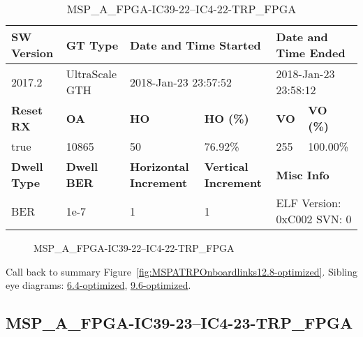 \begin{table}[h]
\centering
\caption{MSP\_A\_FPGA-IC39-22--IC4-22-TRP\_FPGA}
\label{tab:MSPAFPGAIC3922IC422TRPFPGA12.8-optimized}
\begin{tabular}{@{}|l|l|l|l|l|l|@{}}
\toprule
\textbf{SW Version}                & \textbf{GT Type}   & \multicolumn{2}{l|}{\textbf{Date and Time Started}}            & \multicolumn{2}{l|}{\textbf{Date and Time Ended}}        \\ \midrule
2017.2                       & UltraScale GTH          & \multicolumn{2}{l|}{2018-Jan-23 23:57:52}                   & \multicolumn{2}{l|}{2018-Jan-23 23:58:12}               \\ \midrule
\textbf{Reset RX}                  & \textbf{OA} & \textbf{HO}   & \textbf{HO (\%)} & \textbf{VO} & \textbf{VO (\%)} \\ \midrule
true & 10865        & 50          & 76.92\%        & 255        & 100.00\%       \\ \midrule
\textbf{Dwell Type}                & \textbf{Dwell BER} & \textbf{Horizontal Increment} & \textbf{Vertical Increment}    & \multicolumn{2}{l|}{\textbf{Misc Info}}                  \\ \midrule
BER                            & 1e-7        & 1        & 1           & \multicolumn{2}{l|}{ELF Version: 0xC002 SVN: 0}                         \\ \bottomrule
\end{tabular}
\end{table}

\begin{figure}[h]
\caption{MSP\_A\_FPGA-IC39-22--IC4-22-TRP\_FPGA} \label{fig:MSPAFPGAIC3922IC422TRPFPGA12.8-optimized}
\end{figure}

Call back to summary Figure~\ref{fig:MSPATRPOnboardlinks12.8-optimized}.
Sibling eye diagrams: \hyperref[sec:MSPAFPGAIC3922IC422TRPFPGA6.4-optimized]{6.4-optimized}, \hyperref[sec:MSPAFPGAIC3922IC422TRPFPGA9.6-optimized]{9.6-optimized}.

\clearpage
\newpage


\subsection{MSP\_A\_FPGA-IC39-23--IC4-23-TRP\_FPGA}\label{sec:MSPAFPGAIC3923IC423TRPFPGA12.8-optimized}

